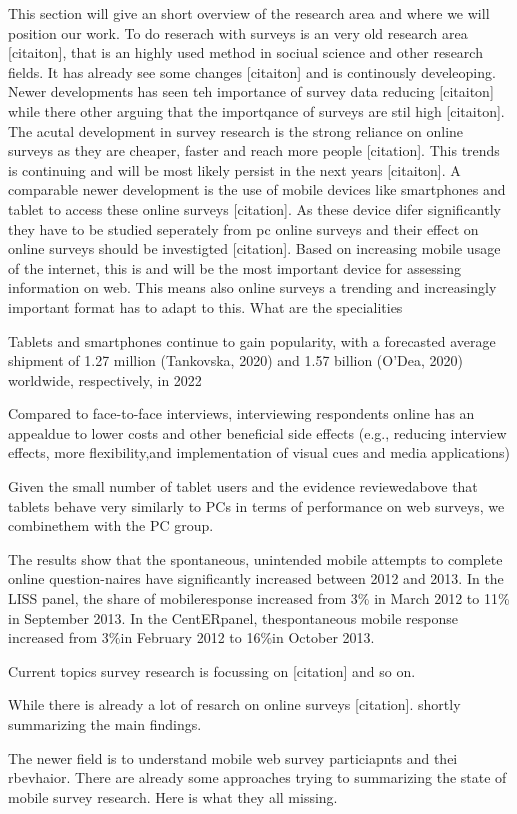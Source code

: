 This section will give an short overview of the research area and where we will position our work. To do reserach with surveys is an very old research area [citaiton], that is an highly used method in sociual science and other research fields. It has already see some changes [citaiton] and is continously develeoping. Newer developments has seen teh importance of survey data reducing [citaiton] while there other arguing that the importqance of surveys are stil high [citaiton]. The acutal development in survey research  is the strong reliance on online surveys as they are cheaper, faster and reach more people [citation]. This trends is continuing and will be most likely persist in the next years [citaiton]. A comparable newer development is the use of mobile devices like smartphones and tablet to access these online surveys [citation]. As these device difer significantly they have to be studied seperately from pc online surveys and their effect on online surveys should be investigted [citation].
Based on increasing mobile usage of the internet, this is and will be the most important device for assessing information on web. This means also online surveys a trending and increasingly important format has to adapt to this. What are the specialities

Tablets and smartphones continue to gain popularity, with a forecasted average shipment of 1.27 million (Tankovska, 2020) and 1.57 billion (O’Dea, 2020) worldwide, respectively, in 2022 \cite{weigold_computerized_2021}

Compared to face-to-face interviews, interviewing respondents online has an appealdue to lower costs and other beneficial side effects (e.g., reducing interview effects, more flexibility,and implementation of visual cues and media applications) \cite{gummer_does_2019}

Given the small number of tablet users and the evidence reviewedabove that tablets behave very similarly to PCs in terms of performance on web surveys, we combinethem with the PC group. \cite{couper_why_2017}

The results show that the spontaneous, unintended mobile attempts to complete online question-naires have significantly increased between 2012 and 2013. In the LISS panel, the share of mobileresponse increased from 3\% in March 2012 to 11\% in September 2013. In the CentERpanel, thespontaneous mobile response increased from 3\%in February 2012 to 16\%in October 2013. \cite{de_bruijne_mobile_2014}


Current topics survey research is focussing on [citation] and so on.


While there is already a lot of resarch on online surveys [citation]. shortly summarizing the main findings.



The newer field is to understand mobile web survey particiapnts and thei rbevhaior. There are already some approaches trying to summarizing the state of mobile survey research. Here is what they all missing. 